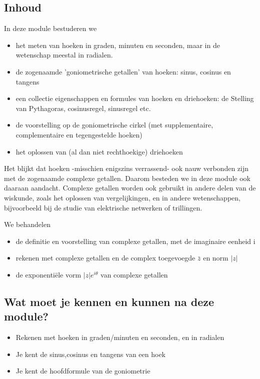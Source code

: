 \documentclass{ximera}
\begin{document}
\subsection{Inhoud}
\begin{expandable}
In deze module bestuderen we 
	\begin{itemize}
		\item het meten van hoeken in graden, minuten en seconden, maar in de wetenschap meestal in radialen.
        	\item de zogenaamde 'goniometrische getallen' van hoeken: sinus, cosinus en tangens
	    	\item een collectie eigenschappen en formules van hoeken en driehoeken: de Stelling van Pythagoras, cosinusregel, sinusregel etc.
        	\item de voorstelling op de goniometrische cirkel (met supplementaire, complementaire en tegengestelde hoeken)
	   	\item het oplossen van (al dan niet rechthoekige) driehoeken
	\end{itemize}

Het blijkt dat hoeken -misschien enigszins verrassend-  ook nauw verbonden zijn met de zogenaamde complexe getallen. Daarom besteden we in deze module ook daaraan aandacht. Complexe getallen worden ook gebruikt in andere delen van de wiskunde, zoals het oplossen van vergelijkingen, en in andere wetenschappen, bijvoorbeeld bij de studie van elektrische netwerken of trillingen.

We behandelen
	\begin{itemize}
		\item de definitie en voorstelling van complexe getallen, met de imaginaire eenheid i
		\item rekenen met complexe getallen en de complex toegevoegde $\bar{z}$ en norm $|z|$
		\item de exponentiële vorm $|z|e^{iθ}$ van complexe getallen
	\end{itemize}
\end{expandable}

\subsection{Wat moet je kennen en kunnen na deze module?}

\begin{expandable}
	\begin{itemize}
		\item Rekenen met hoeken in graden/minuten en seconden, en in radialen
		\item Je kent de sinus,cosinus en tangens van een hoek
		\item Je kent de hoofdformule van de goniometrie
	\end{itemize}
\end{expandable}
\end{document}
